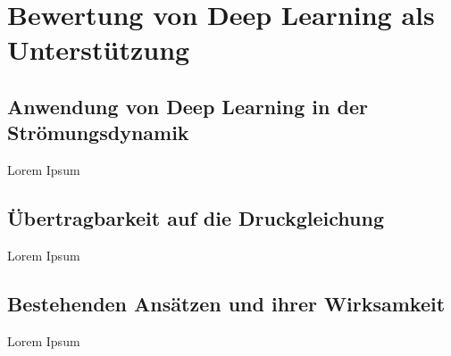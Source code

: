 \section{Bewertung von Deep Learning als Unterstützung}

\subsection{Anwendung von Deep Learning in der Strömungsdynamik}
Lorem Ipsum

\subsection{Übertragbarkeit auf die Druckgleichung}
Lorem Ipsum

\subsection{Bestehenden Ansätzen und ihrer Wirksamkeit}
Lorem Ipsum